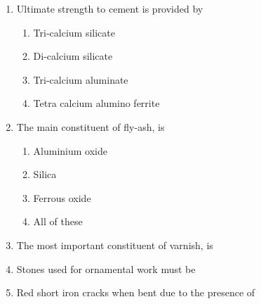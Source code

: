 \documentclass[11pt,a4paper]{article}
\begin{document}
\begin{enumerate}
\item{Ultimate strength to cement is provided by}
\begin{enumerate}[label=\Alph*.]
\item{Tri-calcium silicate}
\item{Di-calcium silicate}
\item{Tri-calcium aluminate}
\item{Tetra calcium alumino ferrite}
\end{enumerate}
\item{The main constituent of fly-ash, is}
\begin{enumerate}[label=\Alph*.]
\item{Aluminium oxide}
\item{Silica}
\item{Ferrous oxide}
\item{All of these}
\end{enumerate}
\item{The most important constituent of varnish, is}
\\
\item{Stones used for ornamental work must be}
\\
\item{Red short iron cracks when bent due to the presence of}
\\
\end{enumerate}
\end{document}
